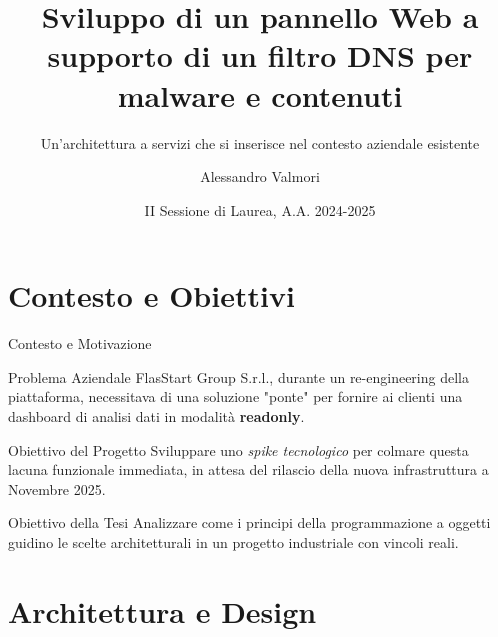 \documentclass[8pt]{beamer}
\title{Sviluppo di un pannello Web a supporto di un filtro DNS per malware e contenuti}
\subtitle{Un'architettura a servizi che si inserisce nel contesto aziendale esistente}
\date{II Sessione di Laurea, A.A. 2024-2025}
\author{Alessandro Valmori}
\institute{Università di Bologna \and Relatore: Prof. Mirko Viroli \and Correlatore: Dott. Nicolas Farabegoli}
\begin{document}
\maketitle



\section{Contesto e Obiettivi}

\begin{frame}{Contesto e Motivazione}
  \begin{block}{Problema Aziendale }
    FlasStart Group S.r.l., durante un re-engineering della piattaforma, necessitava di una soluzione "ponte" per fornire ai clienti una dashboard di analisi dati in modalità \textbf{readonly}.
  \end{block}
  \begin{block}{Obiettivo del Progetto }
    Sviluppare uno \textit{spike tecnologico} per colmare questa lacuna funzionale immediata, in attesa del rilascio della nuova infrastruttura a Novembre 2025.
  \end{block}
  \begin{alertblock}{Obiettivo della Tesi }
    Analizzare come i principi della programmazione a oggetti guidino le scelte architetturali in un progetto industriale con vincoli reali.
  \end{alertblock}
\end{frame}

\section{Architettura e Design}
\end{document}
